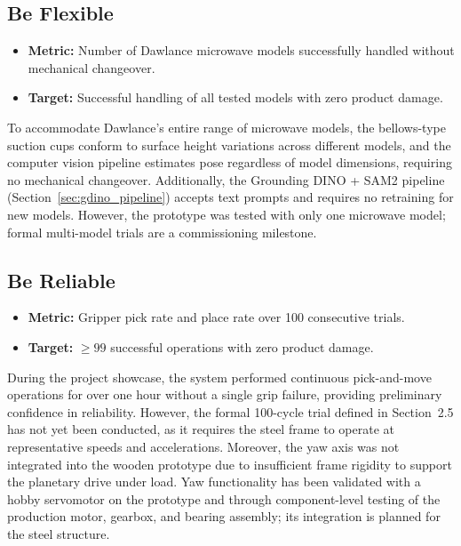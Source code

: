 \subsection{Be Flexible}

\begin{itemize}
    \item \textbf{Metric:} Number of Dawlance microwave models successfully handled without mechanical changeover.
    \item \textbf{Target:} Successful handling of all tested models with zero product damage.
\end{itemize}

To accommodate Dawlance's entire range of microwave models, the bellows-type suction cups conform to surface height variations across different models, and the computer vision pipeline estimates pose regardless of model dimensions, requiring no mechanical changeover. Additionally, the Grounding DINO + SAM2 pipeline (Section~\ref{sec:gdino_pipeline}) accepts text prompts and requires no retraining for new models. However, the prototype was tested with only one microwave model; formal multi-model trials are a commissioning milestone.

\subsection{Be Reliable}

\begin{itemize}
    \item \textbf{Metric:} Gripper pick rate and place rate over 100 consecutive trials.
    \item \textbf{Target:} $\geq 99$ successful operations with zero product damage.
\end{itemize}

During the project showcase, the system performed continuous pick-and-move operations for over one hour without a single grip failure, providing preliminary confidence in reliability. However, the formal 100-cycle trial defined in Section~2.5 has not yet been conducted, as it requires the steel frame to operate at representative speeds and accelerations. Moreover, the yaw axis was not integrated into the wooden prototype due to insufficient frame rigidity to support the planetary drive under load. Yaw functionality has been validated with a hobby servomotor on the prototype and through component-level testing of the production motor, gearbox, and bearing assembly; its integration is planned for the steel structure.


